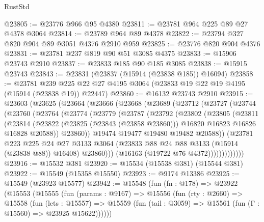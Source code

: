 \begin{lexlean}{RustStd}
\begin{coremodule}
@23805 := @23776 @966 @95 @4380
@23811 := @23781 @964 @225 @89 @27 @4378 @3064
@23814 := @23789 @964 @89 @4378
@23822 := @23794 @327 @820 @904 @89 @3051 @4376 @2910 @959
@23825 := @23776 @820 @904 @4376
@23831 := @23781 @237 @819 @90 @51 @3085 @4375
@23833 := @15906 @23743 @2910
@23837 := @23833 @185 @90 @185 @3085
@23838 := @15915 @23743
@23843 := @23831 (@23837 (@15914 (@23838 @185)) @16094)
@23858 := @23781
    @239
    @225
    @22
    @27
    @4195
    @3064
    (@23833 @19 @22 @19 @4195 (@15914 (@23838 @19)) @22447)
@23860 := @16132 @23743 @2910
@23915 := @23603
    (@23625
      (@23664
        (@23666
          (@23668
            (@23689
              (@23712
                (@23727
                  (@23744
                    (@23760
                      (@23764
                        (@23774
                          (@23779
                            (@23787
                              (@23792
                                (@23802
                                  (@23805
                                    (@23811
                                      (@23814
                                        (@23822
                                          (@23825 (@23843 (@23858 @23860)))
                                          @16820
                                          @16823
                                          @16826
                                          @16828
                                          @20588))
                                      @23860))
                                  @19474
                                  @19477
                                  @19480
                                  @19482
                                  @20588))
                              (@23781
                                @223
                                @225
                                @24
                                @27
                                @3133
                                @3064
                                (@23833 @88 @24 @88 @3133 (@15914 (@23838 @88)) @16408)
                                @23860)))
                          (@16163 (@19722 @76 @4372)))))))))))))
@23916 := @15532 @381
@23920 := @15534 (@15538 @381) (@15544 @381)
@23922 := @15549 (@15358 @15550)
@23923 := @9174 @13386
@23925 := @15549 (@23923 @15577)
@23942 := @15548
    (fun (fn : @178) =>
    @23922
      (@15553
        (@15555
          (fun (params : @9167) =>
          @15556
            (fun (rty : @2660) =>
            @15558
              (fun (lets : @15557) =>
              @15559 (fun (tail : @3059) => @15561 (fun (Γ : @15560) => @23925 @15622))))))

\end{coremodule}
\end{lexlean}
